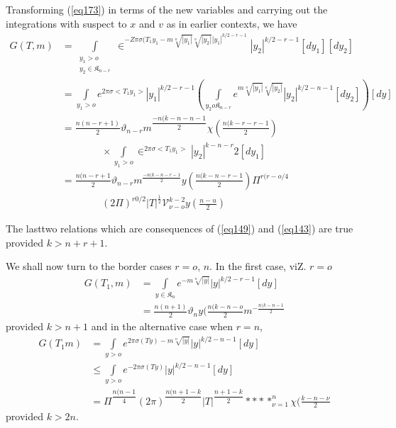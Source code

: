 Transforming (\ref{eq173}) in terms of the new variables and carrying out
the integrations with suspect to $x$ and $v$ as in earlier contexts,
we have 
{\fontsize{10pt}{12pt}\selectfont
\begin{align*}
G (T, m) & = \int\limits_{\substack{y_1 > o \\ y_2 \in \mathfrak{K}_{n
      - r}}} \in^{-Z \pi \sigma (T_1 y_1 - m \sqrt[n]{| y_1 |}
  \sqrt[n]{|y_2|} | y_1 |^{k/2 - r - 1}} | y_2 |^{k/2 - r -1} [dy_1]
[dy_2]\\ 
& = \int\limits_{y_1 > o} e^{2 \pi \sigma < T_1 y_1>} |y_1|^{k/2 - r -
  1} \left ( \int\limits_{y_2 o \mathfrak{K}_{n-r}} e^{m
  \sqrt[n]{|y_1|} \sqrt[n]{|y_2|}} |y_2|^{k/2 - n - 1} [dy_2 ] \right)
[dy]\\ 
& = \frac{n (n - r + 1)}{2} \vartheta_{n - r} m^{\dfrac{-n (k - n -n
    -1}{2}} \chi \left( \frac{n (k - r - r - 1}{2} \right)\\
& \qquad \qquad \times
\int\limits_{y_1 > o} \in^{2 \pi \sigma < T_1 y_1 >} |y_2 |^{k - n
  -r}{2} [dy_1]\\ 
& = \frac{n(n-r+1}{2} \vartheta_{n - r} m ^{\frac{-n(k - n - r -1}{2}}
y \left( \frac{n(k - n - r - 1}{2} \right) \Pi^{r(r-o/4} \\
& \qquad \qquad (2
\Pi)^{r 0/2} | T |^{\frac{1}{2}} \mathscr{V}_{\nu - o}^{k - 2} y
\left( \frac{n - u}{2} \right) 
\end{align*}}

The last\pageoriginale  two relations which are consequences of
(\ref{eq149}) and (\ref{eq143}) are true provided $k > n + r + 1$.   

We shall now turn to the border cases $r = o$, $n$. In the first case,
viZ. $r = o$ 
\begin{align*}
G (T_1, m) & = \int\limits_{y \in \mathfrak{K}_n} e^{-m \sqrt[n]{| y
    |}} | y |^{k/2 - r - 1} [d y]\\ 
& = \frac{n (n + 1)}{2} \vartheta_n y \big(\frac{n (k - n -o}{2}
m^{-\frac{n (k - n - 1}{2}} 
\end{align*}
provided $k > n + 1$
and in the alternative case when $r = n$,
\begin{align*}
G (T_1 m) & = \int\limits_{y > o} e^{2 \pi \sigma (T y) - m \sqrt[n]{| y |}}
| y |^{k/2 - n - 1} [ d y]\\ 
& \le \int\limits_{y > o} e^{-2 \pi \sigma (T y)} | y |^{k/2 - n -1} [dy]\\
& = \Pi ^{\dfrac{n (n - 1}{4}} (2 \pi)^{\dfrac{n(n+1-k}{2}} | T
|^{\dfrac{n + 1 -k}{2}} ****_{\nu = 1}^{n} \chi( \frac{k - n - \nu}{2} 
\end{align*}
provided $k > 2n$.

